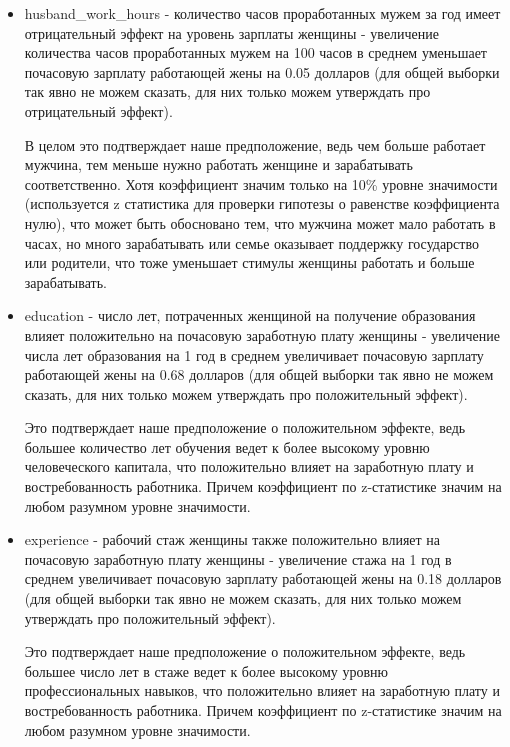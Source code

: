 \documentclass[a4paper,12pt]{article}
\begin{document}
\begin{itemize}
	\item  husband\_work\_hours - количество часов проработанных мужем за год имеет отрицательный эффект на уровень зарплаты женщины - увеличение количества часов проработанных мужем на 100 часов в среднем уменьшает почасовую зарплату работающей жены на 0.05 долларов (для общей выборки так явно не можем сказать, для них только можем утверждать про отрицательный эффект).
	
	В целом это подтверждает наше предположение, ведь чем больше работает мужчина, тем меньше нужно работать женщине и зарабатывать соответственно. Хотя коэффициент значим только на 10\% уровне значимости (используется z статистика для проверки гипотезы о равенстве коэффициента нулю), что может быть обосновано тем, что мужчина может мало работать в часах, но много зарабатывать или семье оказывает поддержку государство или родители, что тоже уменьшает стимулы женщины работать и больше зарабатывать.
	
	\item education - число лет, потраченных женщиной на
	получение образования влияет положительно на почасовую заработную плату женщины - 
	увеличение числа лет образования на 1 год в среднем увеличивает почасовую зарплату работающей жены на 0.68 долларов (для общей выборки так явно не можем сказать, для них только можем утверждать про положительный эффект).
	
	Это подтверждает наше предположение о положительном эффекте, ведь большее количество лет обучения ведет к более высокому уровню человеческого капитала, что положительно влияет на заработную плату и востребованность работника. Причем коэффициент по z-статистике значим на любом разумном уровне значимости.
	
	\item experience - рабочий стаж женщины также положительно влияет на почасовую заработную плату женщины - 
	увеличение стажа на 1 год в среднем увеличивает почасовую зарплату работающей жены на 0.18 долларов (для общей выборки так явно не можем сказать, для них только можем утверждать про положительный эффект).
	
	Это подтверждает наше предположение о положительном эффекте, ведь большее число лет в стаже ведет к более высокому уровню профессиональных  навыков, что положительно влияет на заработную плату и востребованность работника. Причем коэффициент по z-статистике значим на любом разумном уровне значимости.
	
	
\end{itemize} 
\end{document}
